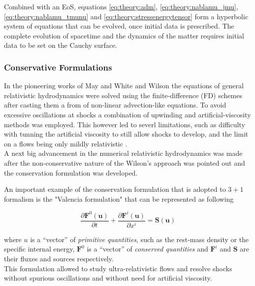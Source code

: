 \documentclass[11pt,a4paper,headinclude=true,DIV=14,BCOR=8mm,chapterprefix,listof=totoc,twoside,openright,abstracton]{scrbook}
\begin{document}
Combined with an EoS, equations \ref{eq:theory:adm}, \ref{eq:theory:nablamu_jmu}, \ref{eq:theory:nablamu_tmunu} and \ref{eq:theory:stressenergytensor} form a hyperbolic
system of equations that can be evolved, once initial data is prescribed. The complete evolution of spacetime and the dynamics of the matter requires initial data to be set on the Cauchy surface.

\subsubsection{Conservative Formulations}

In the pioneering works of May and White \cite{May:1966} and Wilson \cite{Wilson:1972} the equations of general relativistic hydrodynamics were solved using the finite-difference (FD) schemes after casting them a from of non-linear advection-like equations. To avoid excessive oscillations at shocks a combination of upwinding and artificial-viscosity methods was employed. This however led to severl limitations, such as difficulty with tunning the artificial viscosity to still allow shocks to develop, and the limit on a flows being only mildly relativistic \cite{Font:2008fka}. \\
A next big advancement in the numerical relativistic hydrodynamics was made after the non-conservative nature of the Wilson’s approach was pointed out \cite{Marti:1991wi} and the conservation formulation was developed. 

An important example of the conservation formulation that is adopted to $3 + 1$ formalism is the "Valencia formulation" \cite{Banyuls:1997} that can be represented as following

\begin{equation}
    \frac{\partial\boldsymbol{F}^{0}(\boldsymbol{u})}{\partial t} + \frac{\partial\boldsymbol{F}^{i}(\boldsymbol{u})}{\partial x^{i}} = \boldsymbol{S}(\boldsymbol{u})
    \label{eq:theory:valencia_formalism}
\end{equation}

where $u$ is a “vector” of \textit{primitive quantities}, such as the rest-mass density or the specific internal energy, $\boldsymbol{F}^0$ is a “vector” of \textit{conserved quantities} and $\boldsymbol{F}^i$ and $\boldsymbol{S}$ are their fluxes and sources respectively. \\

This formulation allowed to study ultra-relativistic flows and resolve shocks without spurious oscillations and without need for artificial viscosity.
\end{document}
